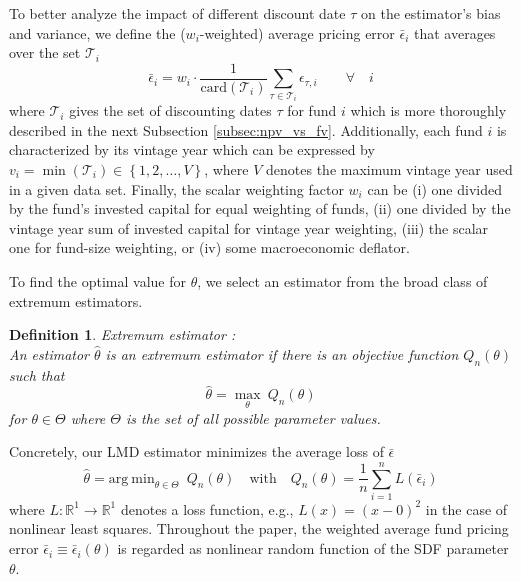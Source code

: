 \documentclass[12pt]{article}
\newtheorem{definition}{Definition}
\begin{document}
\fi

To better analyze the impact of different discount date $\tau$ on the estimator's bias and variance, we define the ($w_i$-weighted) average pricing error $\bar{\epsilon}_{i}$ that averages over the set $\mathcal{T}_i$
\begin{equation}
\label{eq:average_pricing_error}
\bar{\epsilon}_{i} =
w_{i} \cdot
\frac{1}{ \mathrm{card}(\mathcal{T}_{i}) }
\sum_{\tau \in \mathcal{T}_{i}}
\epsilon_{\tau,i}
\qquad \forall \quad i
\end{equation}
where $\mathcal{T}_i$ gives the set of discounting dates $\tau$ for fund $i$ which is more thoroughly described in the next Subsection \ref{subsec:npv_vs_fv}.
Additionally, each fund $i$ is characterized by its vintage year which can be expressed by $v_{i}=\min(\mathcal{T}_i) \in \left\{ 1,2,\dots,V \right\}$, where $V$ denotes the maximum vintage year used in a given data set.
Finally, the scalar weighting factor $w_i$ can be (i) one divided by the fund's invested capital for equal weighting of funds, (ii) one divided by the vintage year sum of invested capital for vintage year weighting, (iii) the scalar one for fund-size weighting, or (iv) some macroeconomic deflator.

To find the optimal value for $\theta$, we select an estimator from the broad class of extremum estimators.
\begin{definition}
	\label{def:extremum_estimator}
	Extremum estimator \cite[Equation 1.1]{NM94}: \\
	An estimator $\hat{\theta}$ is an extremum estimator if there is an objective function $Q_n(\theta)$ such that
	\[
	\hat{\theta} = \max_{\theta} \ Q_n(\theta)
	\]
	for $\theta \in \Theta$ where $\Theta$ is the set of all possible parameter values.
\end{definition}

Concretely, our LMD estimator \cite[Equation 7.1]{PP97} minimizes the average loss of $\bar{\epsilon}$
\begin{equation}
\label{eq:estimator}
\hat{\theta} = 
\mathrm{arg \ min}_{\theta \in \Theta}
\enspace
Q_n(\theta)
\quad
\mathrm{with}
\quad
Q_n(\theta) = 
\frac{1}{n}
\sum_{i=1}^n
L \left( \bar{\epsilon}_{i} \right) 
\end{equation}
where $L: \mathbb{R}^{1} \rightarrow \mathbb{R}^1$ denotes a loss function, e.g., $L(x)=(x-0)^2$ in the case of nonlinear least squares.
Throughout the paper, the weighted average fund pricing error $\bar{\epsilon}_i \equiv \bar{\epsilon}_i(\theta)$ is regarded as nonlinear random function of the SDF parameter $\theta$.
\end{document}
